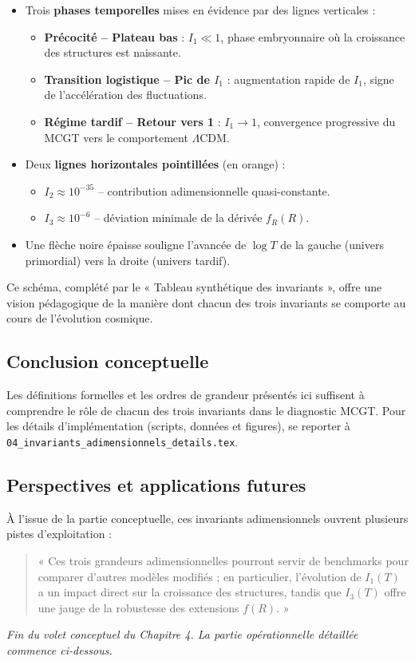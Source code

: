 \begin{itemize}
  \item Trois \textbf{phases temporelles} mises en évidence par des lignes verticales :
    \begin{itemize}
      \item \textbf{Précocité – Plateau bas}
        : \(I_{1}\ll1\), phase embryonnaire où la croissance des structures est naissante.
      \item \textbf{Transition logistique – Pic de \(I_{1}\)}
        : augmentation rapide de \(I_{1}\), signe de l’accélération des fluctuations.
      \item \textbf{Régime tardif – Retour vers 1}
        : \(I_{1}\to1\), convergence progressive du MCGT vers le comportement \(\Lambda\)CDM.
    \end{itemize}
  \item Deux \textbf{lignes horizontales pointillées} (en orange) :
    \begin{itemize}
      \item \(I_{2}\approx10^{-35}\)  -- contribution adimensionnelle quasi-constante.
      \item \(I_{3}\approx10^{-6}\)   -- déviation minimale de la dérivée \(f_{R}(R)\).
    \end{itemize}
  \item Une flèche noire épaisse souligne l’avancée de \(\log T\)
        de la gauche (univers primordial) vers la droite (univers tardif).
\end{itemize}

Ce schéma, complété par le « Tableau synthétique des invariants », offre une vision pédagogique
de la manière dont chacun des trois invariants se comporte au cours de l’évolution cosmique.

\subsection{Conclusion conceptuelle}
Les définitions formelles et les ordres de grandeur présentés ici suffisent à comprendre le rôle de chacun des trois invariants dans le diagnostic MCGT.
Pour les détails d’implémentation (scripts, données et figures), se reporter à \texttt{04\_invariants\_adimensionnels\_details.tex}.

\subsection{Perspectives et applications futures}

À l’issue de la partie conceptuelle, ces invariants adimensionnels ouvrent plusieurs pistes d’exploitation :

\begin{quote}
« Ces trois grandeurs adimensionnelles pourront servir de benchmarks pour comparer d’autres modèles modifiés ; en particulier, l’évolution de \(I_{1}(T)\) a un impact direct sur la croissance des structures, tandis que \(I_{3}(T)\) offre une jauge de la robustesse des extensions \(f(R)\). »
\end{quote}

\noindent\emph{Fin du volet conceptuel du Chapitre 4. La partie opérationnelle détaillée commence ci-dessous.}
